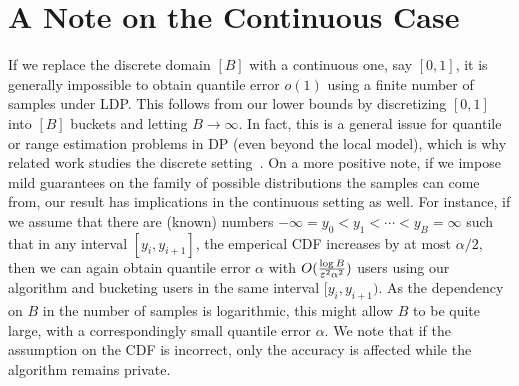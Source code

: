 \section{A Note on the Continuous Case}\label{sec:continuous} If we replace the discrete domain $[B]$ with a continuous one, say $[0,1]$, it is generally impossible to obtain quantile error $o(1)$ using a finite number of samples under LDP. This follows from our lower bounds by discretizing $[0,1]$ into $[B]$ buckets and letting $B\to \infty$. In fact, this is a general issue for quantile or range estimation problems in DP (even beyond the local model), which is why related work studies the discrete setting~\cite{BeimelNS16twotologstar,Bun2015logstar,Kaplan2020closinggap,kulkarni2019answering}. On a more positive note, if we impose mild guarantees on the family of possible distributions the samples can come from, our result has implications in the continuous setting as well. For instance, if we assume that there are (known) numbers $-\infty=y_0<y_1<\cdots <y_B=\infty$ such that in any interval $[y_i,y_{i+1}]$, the emperical CDF increases by at most $\alpha/2$, then we can again obtain quantile error $\alpha$ with $O(\frac{\log B}{\varepsilon^2\alpha^2})$ users using our algorithm and bucketing users in the same interval $[y_i,y_{i+1})$. As the dependency on $B$
 in the number of samples is logarithmic, this might allow 
 $B$ to be quite large, with a correspondingly small quantile error $\alpha$. We note that if the assumption on the CDF is incorrect, only the accuracy is affected while the algorithm remains private.